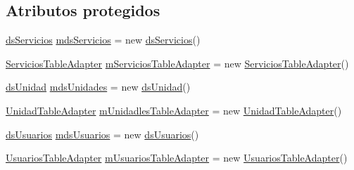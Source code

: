 \subsection*{Atributos protegidos}
\begin{DoxyCompactItemize}
\item 
\hyperlink{class_proyecto___integrador__3_1_1ds_servicios}{ds\-Servicios} \hyperlink{class_proyecto___integrador__3_1_1_d_b_managers_a6b992d164f75898c6f9717fd5b839fa4}{mds\-Servicios} = new \hyperlink{class_proyecto___integrador__3_1_1ds_servicios}{ds\-Servicios}()
\item 
\hyperlink{class_proyecto___integrador__3_1_1ds_servicios_table_adapters_1_1_servicios_table_adapter}{Servicios\-Table\-Adapter} \hyperlink{class_proyecto___integrador__3_1_1_d_b_managers_a1f9e67f272910356a732a882769c8dac}{m\-Servicios\-Table\-Adapter} = new \hyperlink{class_proyecto___integrador__3_1_1ds_servicios_table_adapters_1_1_servicios_table_adapter}{Servicios\-Table\-Adapter}()
\item 
\hyperlink{class_proyecto___integrador__3_1_1ds_unidad}{ds\-Unidad} \hyperlink{class_proyecto___integrador__3_1_1_d_b_managers_a0e58571e4517bd6ac941eae32baaf978}{mds\-Unidades} = new \hyperlink{class_proyecto___integrador__3_1_1ds_unidad}{ds\-Unidad}()
\item 
\hyperlink{class_proyecto___integrador__3_1_1ds_unidad_table_adapters_1_1_unidad_table_adapter}{Unidad\-Table\-Adapter} \hyperlink{class_proyecto___integrador__3_1_1_d_b_managers_a5d36d244f440437683f2b0cd30720ac5}{m\-Unidadles\-Table\-Adapter} = new \hyperlink{class_proyecto___integrador__3_1_1ds_unidad_table_adapters_1_1_unidad_table_adapter}{Unidad\-Table\-Adapter}()
\item 
\hyperlink{class_proyecto___integrador__3_1_1ds_usuarios}{ds\-Usuarios} \hyperlink{class_proyecto___integrador__3_1_1_d_b_managers_a19d87c9abf32e08e2969847a008eb195}{mds\-Usuarios} = new \hyperlink{class_proyecto___integrador__3_1_1ds_usuarios}{ds\-Usuarios}()
\item 
\hyperlink{class_proyecto___integrador__3_1_1ds_usuarios_table_adapters_1_1_usuarios_table_adapter}{Usuarios\-Table\-Adapter} \hyperlink{class_proyecto___integrador__3_1_1_d_b_managers_a8830e1bb507bcd7277966a4aabe3e830}{m\-Usuarios\-Table\-Adapter} = new \hyperlink{class_proyecto___integrador__3_1_1ds_usuarios_table_adapters_1_1_usuarios_table_adapter}{Usuarios\-Table\-Adapter}()
\end{DoxyCompactItemize}
